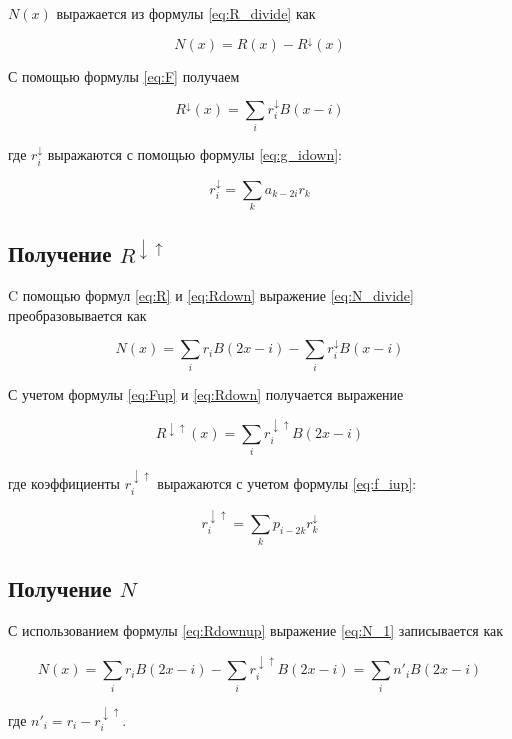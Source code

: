 $N(x)$ выражается из формулы \ref{eq:R_divide} как

\begin{equation}\label{eq:N_divide}
	N(x)=R(x)-R^{\downarrow}(x)
\end{equation}

С помощью формулы \ref{eq:F} получаем

\begin{equation}\label{eq:Rdown}
	R^{\downarrow}(x)=\sum_{i}r_{i}^{\downarrow}B(x-i)
\end{equation}

где $r_{i}^{\downarrow}$ выражаются с помощью формулы \ref{eq:g_idown}:

\begin{equation}\label{eq:r_idown}
	r_i^{\downarrow}=\sum_{k}a_{k-2i}r_k
\end{equation}

\subsection{Получение $R^{\downarrow\uparrow}$}

C помощью формул \ref{eq:R} и \ref{eq:Rdown} выражение \ref{eq:N_divide} преобразовывается как

\begin{equation}\label{eq:N_1}
	N(x)=\sum_{i}r_{i}B(2x-i)-\sum_{i}r_{i}^{\downarrow}B(x-i)
\end{equation}

С учетом формулы \ref{eq:Fup} и \ref{eq:Rdown} получается выражение

\begin{equation}\label{eq:Rdownup}
	R^{\downarrow\uparrow}(x)=\sum_{i}r_{i}^{\downarrow\uparrow}B(2x-i)
\end{equation}

где коэффициенты $r_{i}^{\downarrow\uparrow}$ выражаются с учетом формулы \ref{eq:f_iup}:

\begin{equation}\label{eq:r_idownup}
	r_i^{\downarrow\uparrow}=\sum_{k}p_{i-2k}r_k^{\downarrow}
\end{equation}

\subsection{Получение $N$}

С использованием формулы \ref{eq:Rdownup} выражение \ref{eq:N_1} записывается как

\begin{equation}\label{eq:N}
	N(x)=\sum_{i}r_{i}B(2x-i)-\sum_{i}r_{i}^{\downarrow\uparrow}B(2x-i)=\sum_{i}n'_{i}B(2x-i)
\end{equation}

где $n'_i=r_i-r_i^{\downarrow\uparrow}$.